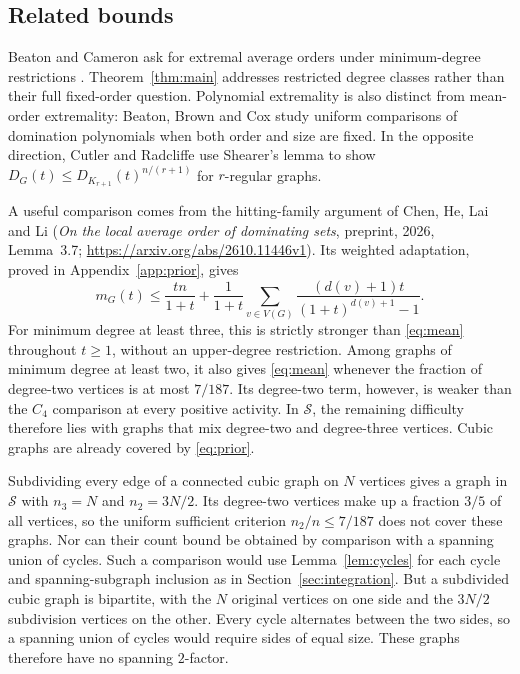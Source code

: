 \documentclass[11pt]{article}
\begin{document}
\subsection{Related bounds}
Beaton and Cameron ask for extremal average orders under minimum-degree restrictions \cite[Section 4, Problem 1]{BC2024}. Theorem~\ref{thm:main} addresses restricted degree classes rather than their full fixed-order question. Polynomial extremality is also distinct from mean-order extremality: Beaton, Brown and Cox \cite{BBC2020} study uniform comparisons of domination polynomials when both order and size are fixed. In the opposite direction, Cutler and Radcliffe \cite{CR2016} use Shearer's lemma to show $D_G(t)\le D_{K_{r+1}}(t)^{n/(r+1)}$ for $r$-regular graphs.

A useful comparison comes from the hitting-family argument of Chen, He, Lai and Li (\emph{On the local average order of dominating sets}, preprint, 2026, Lemma~3.7; \url{https://arxiv.org/abs/2610.11446v1}). Its weighted adaptation, proved in Appendix~\ref{app:prior}, gives
\begin{equation}\label{eq:prior}
 m_G(t)\le\frac{tn}{1+t}
 +\frac1{1+t}\sum_{v\in V(G)}
       \frac{(d(v)+1)t}{(1+t)^{d(v)+1}-1}.
\end{equation}
For minimum degree at least three, this is strictly stronger than \eqref{eq:mean} throughout $t\ge1$, without an upper-degree restriction. Among graphs of minimum degree at least two, it also gives \eqref{eq:mean} whenever the fraction of degree-two vertices is at most $7/187$. Its degree-two term, however, is weaker than the $C_4$ comparison at every positive activity. In $\mathcal S$, the remaining difficulty therefore lies with graphs that mix degree-two and degree-three vertices. Cubic graphs are already covered by \eqref{eq:prior}.

Subdividing every edge of a connected cubic graph on $N$ vertices gives a graph in $\mathcal S$ with $n_3=N$ and $n_2=3N/2$. Its degree-two vertices make up a fraction $3/5$ of all vertices, so the uniform sufficient criterion $n_2/n\le7/187$ does not cover these graphs. Nor can their count bound be obtained by comparison with a spanning union of cycles. Such a comparison would use Lemma~\ref{lem:cycles} for each cycle and spanning-subgraph inclusion as in Section~\ref{sec:integration}. But a subdivided cubic graph is bipartite, with the $N$ original vertices on one side and the $3N/2$ subdivision vertices on the other. Every cycle alternates between the two sides, so a spanning union of cycles would require sides of equal size. These graphs therefore have no spanning $2$-factor.
\end{document}
